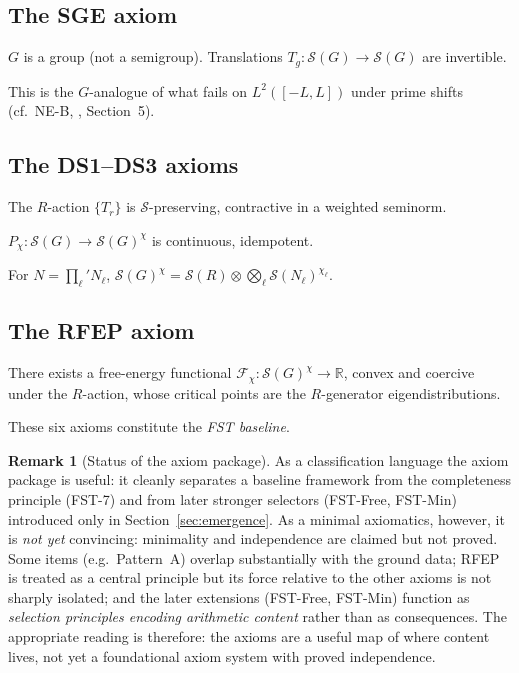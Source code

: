 \documentclass[11pt,a4paper]{article}
\theoremstyle{plain}
\theoremstyle{definition}
\newtheorem{remark}[theorem]{Remark}
\newcommand{\R}{\mathbb{R}}
\renewcommand{\S}{\mathcal{S}}
\newcommand{\chifn}{\chi}
\begin{document}
\subsection{The SGE axiom}

\begin{description}[style=nextline]
\item[(SGE)] $G$ is a group (not a semigroup).  Translations $T_g:
  \S(G) \to \S(G)$ are invertible.
\end{description}

This is the $G$-analogue of what fails on $L^2([-L, L])$ under
prime shifts (cf.~NE-B, \cite{Geiger2026RHII}, Section~5).

\subsection{The DS1--DS3 axioms}

\begin{description}[style=nextline]
\item[(DS1) \textit{Dissipation.}]  The $R$-action
  $\{T_r\}$ is $\S$-preserving, contractive in a weighted
  seminorm.
\item[(DS2) \textit{Selection.}]  $P_\chifn : \S(G) \to
  \S(G)^\chifn$ is continuous, idempotent.
\item[(DS3) \textit{Reproduction.}]  For $N = \prod_\ell' N_\ell$,
  $\S(G)^\chifn = \S(R) \otimes \bigotimes_\ell
  \S(N_\ell)^{\chifn_\ell}$.
\end{description}

\subsection{The RFEP axiom}

\begin{description}[style=nextline]
\item[(RFEP)]  There exists a free-energy functional
  $\mathcal F_\chifn : \S(G)^\chifn \to \R$, convex and coercive
  under the $R$-action, whose critical points are the
  $R$-generator eigendistributions.
\end{description}

These six axioms constitute the \emph{FST baseline}.

\begin{remark}[Status of the axiom package]
\label{rem:axioms-status}
As a classification language the axiom package is useful: it
cleanly separates a baseline framework from the completeness
principle (FST-7) and from later stronger selectors (FST-Free,
FST-Min) introduced only in Section~\ref{sec:emergence}.  As a
minimal axiomatics, however, it is \emph{not yet} convincing:
minimality and independence are claimed but not proved.  Some items
(e.g.\ Pattern~A) overlap substantially with the ground data; RFEP
is treated as a central principle but its force relative to the
other axioms is not sharply isolated; and the later extensions
(FST-Free, FST-Min) function as \emph{selection principles encoding
arithmetic content} rather than as consequences.  The appropriate
reading is therefore: the axioms are a useful map of where
content lives, not yet a foundational axiom system with proved
independence.
\end{remark}
\end{document}
